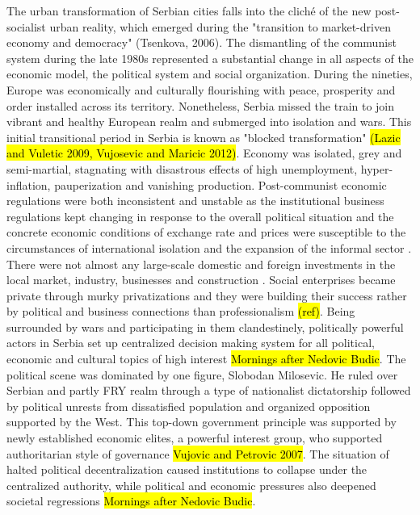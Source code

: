 \documentclass[11pt]{report}
\begin{document}
The urban transformation of Serbian cities falls into the cliché of the new post-socialist urban reality, which emerged during the "transition to market-driven economy and democracy" (Tsenkova, 2006). The dismantling of the communist system during the late 1980s represented a substantial change in all aspects of the economic model, the political system and social organization.
During the nineties, Europe was economically and culturally flourishing with peace, prosperity and order installed across its territory. Nonetheless, Serbia missed the train to join vibrant and healthy European realm and submerged into isolation and wars. \footnotemark
This initial transitional period in Serbia is known as "blocked transformation" \hl{(Lazic and Vuletic 2009, Vujosevic and Maricic 2012)}. Economy was isolated, grey and semi-martial, stagnating with disastrous effects of high unemployment, hyper-inflation, pauperization and vanishing production.
Post-communist economic regulations were both inconsistent and unstable as the institutional business regulations kept changing in response to the overall political situation and the concrete economic conditions of exchange rate and prices were susceptible to the circumstances of international isolation and the expansion of the informal sector \cite{from Grozdanic find references}.
There were not almost any large-scale domestic and foreign investments in the local market, industry, businesses and construction \cite{(Vujosevic and Nedovic 2006)}.
Social enterprises became private through murky privatizations and they were building their success rather by political and business connections than professionalism \hl{(ref)}. Being surrounded by wars and participating in them clandestinely, politically powerful actors in Serbia set up centralized decision making system for all political, economic and cultural topics of high interest \hl{Mornings after Nedovic Budic}. The political scene was dominated by one figure, Slobodan Milosevic. He ruled over Serbian and partly FRY realm through a type of nationalist dictatorship followed by political unrests from dissatisfied population and organized opposition supported by the West. This top-down government principle was supported by newly established economic elites, a powerful interest group, who supported authoritarian style of governance \hl{Vujovic and Petrovic 2007}. The situation of halted political decentralization caused institutions to collapse under the centralized authority, while political and economic pressures also deepened societal regressions \hl{Mornings after Nedovic Budic}. 
\end{document}
